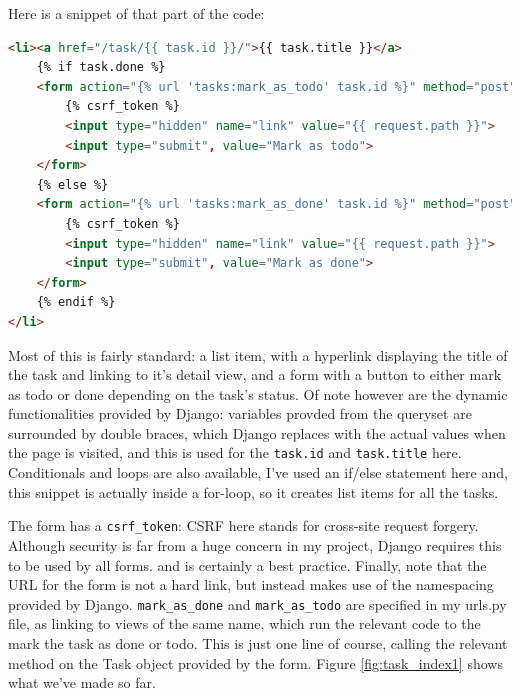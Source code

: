 \documentclass{article}
\begin{document}
Here is a snippet of that part of the code:
\begin{lstlisting}[language=HTML, breaklines]
<li><a href="/task/{{ task.id }}/">{{ task.title }}</a>
    {% if task.done %}
    <form action="{% url 'tasks:mark_as_todo' task.id %}" method="post">
        {% csrf_token %}
        <input type="hidden" name="link" value="{{ request.path }}">
        <input type="submit", value="Mark as todo">
    </form>
    {% else %}
    <form action="{% url 'tasks:mark_as_done' task.id %}" method="post">
        {% csrf_token %}
        <input type="hidden" name="link" value="{{ request.path }}">
        <input type="submit", value="Mark as done">
    </form>
    {% endif %}
</li>
\end{lstlisting}

Most of this is fairly standard:
a list item,
with a hyperlink displaying the title of the task and linking to it's detail view,
and a form with a button to either mark as todo or done depending on the task's status.
Of note however are the dynamic functionalities provided by Django:
variables provded from the queryset are surrounded by double braces,
which Django replaces with the actual values when the page is visited,
and this is used for the \texttt{task.id} and \texttt{task.title} here.
Conditionals and loops are also available,
I've used an if/else statement here and,
this snippet is actually inside a for-loop,
so it creates list items for all the tasks.

The form has a \texttt{csrf\_token}:
CSRF here stands for cross-site request forgery.
Although security is far from a huge concern in my project,
Django requires this to be used by all forms.
and is certainly a best practice.
Finally, note that the URL for the form is not a hard link,
but instead makes use of the namespacing provided by Django.
\texttt{mark\_as\_done} and \texttt{mark\_as\_todo} are specified in my urls.py file,
as linking to views of the same name,
which run the relevant code to the mark the task as done or todo.
This is just one line of course,
calling the relevant method on the Task object provided by the form.
Figure \ref{fig:task_index1} shows what we've made so far.
\end{document}
